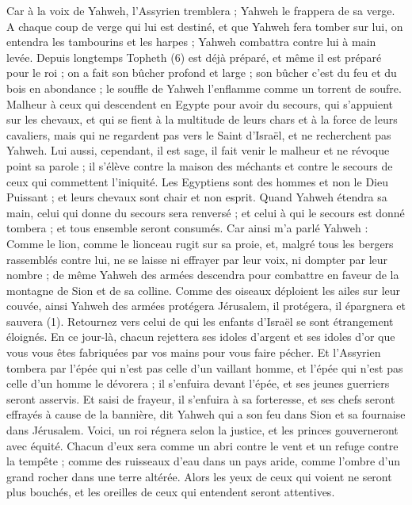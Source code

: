 \begin{multicols}{2}
Car à la voix de Yahweh, l'Assyrien tremblera ; Yahweh le frappera de sa verge.
A chaque coup de verge qui lui est destiné, et que Yahweh fera tomber sur lui, on entendra les tambourins et les harpes ; Yahweh combattra contre lui à main levée.
Depuis longtemps Topheth (6) est déjà préparé, et même il est préparé pour le roi ; on a fait son bûcher profond et large ; son bûcher c'est du feu et du bois en abondance ; le souffle de Yahweh l’enflamme comme un torrent de soufre.
\VerseOne{}Malheur à ceux qui descendent en Egypte pour avoir du secours, qui s'appuient sur les chevaux, et qui se fient à la multitude de leurs chars et à la force de leurs cavaliers, mais qui ne regardent pas vers le Saint d'Israël, et ne recherchent pas Yahweh.
Lui aussi, cependant, il est sage, il fait venir le malheur et ne révoque point sa parole ; il s'élève contre la maison des méchants et contre le secours de ceux qui commettent l’iniquité.
Les Egyptiens sont des hommes et non le Dieu Puissant ; et leurs chevaux sont chair et non esprit. Quand Yahweh étendra sa main, celui qui donne du secours sera renversé ; et celui à qui le secours est donné tombera ; et tous ensemble seront consumés.
Car ainsi m'a parlé Yahweh : Comme le lion, comme le lionceau rugit sur sa proie, et, malgré tous les bergers rassemblés contre lui, ne se laisse ni effrayer par leur voix, ni dompter par leur nombre ; de même Yahweh des armées descendra pour combattre en faveur de la montagne de Sion et de sa colline.
Comme des oiseaux déploient les ailes sur leur couvée, ainsi Yahweh des armées protégera Jérusalem, il protégera, il épargnera et sauvera (1).
Retournez vers celui de qui les enfants d'Israël se sont étrangement éloignés.
En ce jour-là, chacun rejettera ses idoles d’argent et ses idoles d’or que vous vous êtes fabriquées par vos mains pour vous faire pécher.
Et l'Assyrien tombera par l'épée qui n’est pas celle d'un vaillant homme, et l'épée qui n'est pas celle d’un homme le dévorera ; il s'enfuira devant l'épée, et ses jeunes guerriers seront asservis.
Et saisi de frayeur, il s’enfuira à sa forteresse, et ses chefs seront effrayés à cause de la bannière, dit Yahweh qui a son feu dans Sion et sa fournaise dans Jérusalem.
\VerseOne{}Voici, un roi régnera selon la justice, et les princes gouverneront avec équité.
Chacun d’eux sera comme un abri contre le vent et un refuge contre la tempête ; comme des ruisseaux d'eau dans un pays aride, comme l'ombre d'un grand rocher dans une terre altérée.
Alors les yeux de ceux qui voient ne seront plus bouchés, et les oreilles de ceux qui entendent seront attentives.

\end{multicols}
